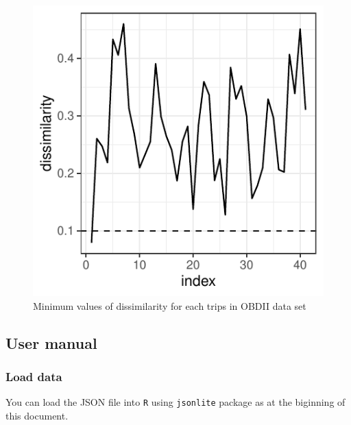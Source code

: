 \documentclass[letterpaper,9pt,twocolumn,twoside,]{pinp}
\begin{document}
\begin{figure}

{\centering \includegraphics{report_issaclee_files/figure-latex/dissimilarity-1} 

}

\caption{Minimum values of dissimilarity for each trips in OBDII data set}\label{fig:dissimilarity}
\end{figure}

\hypertarget{user-manual}{%
\subsection{User manual}\label{user-manual}}

\hypertarget{load-data}{%
\subsubsection{Load data}\label{load-data}}

You can load the JSON file into \texttt{R} using \texttt{jsonlite}
package as at the biginning of this document.

\begin{Shaded}
\begin{Highlighting}[]

\StringTok{ }\NormalTok{(}\NormalTok{)}
\StringTok{ }\NormalTok{(}\NormalTok{)}
\end{Highlighting}
\end{Shaded}
\end{document}
